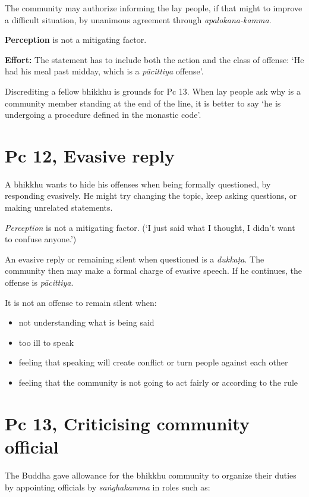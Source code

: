 The community may authorize informing the lay people, if that might to
improve a difficult situation, by unanimous agreement through
\emph{apalokana-kamma}.

\textbf{Perception} is not a mitigating factor.

\textbf{Effort:} The statement has to include both the action and the
class of offense: `He had his meal past midday, which is a
\emph{pācittiya} offense'.

Discrediting a fellow bhikkhu is grounds for Pc 13. When lay people ask
why is a community member standing at the end of the line, it is better
to say `he is undergoing a procedure defined in the monastic code'.

\section{Pc 12, Evasive reply}

A bhikkhu wants to hide his offenses when being formally questioned, by
responding evasively. He might try changing the topic, keep asking
questions, or making unrelated statements.

\emph{Perception} is not a mitigating factor. (`I just said what I
thought, I didn't want to confuse anyone.')

An evasive reply or remaining silent when questioned is a
\emph{dukkaṭa}. The community then may make a formal charge of evasive
speech. If he continues, the offense is \emph{pācittiya}.

It is not an offense to remain silent when:

\begin{itemize}
\tightlist
\item
  not understanding what is being said
\item
  too ill to speak
\item
  feeling that speaking will create conflict or turn people against each
  other
\item
  feeling that the community is not going to act fairly or according to
  the rule
\end{itemize}

\clearpage

\section{Pc 13, Criticising community official}

The Buddha gave allowance for the bhikkhu community to organize their
duties by appointing officials by \emph{saṅghakamma} in roles such as:

